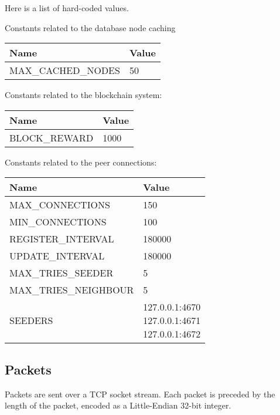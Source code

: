 \documentclass[../documentation.tex]{subfiles}
\begin{document}
Here is a list of hard-coded values.

Constants related to the database node caching

\bgroup{}
\def\arraystretch{1.25}
\begin{tabular}{|l|l|}
    \hline
    \textbf{Name} & \textbf{Value}
    \\ \hline
    MAX\_CACHED\_NODES & 50
    \\ \hline
\end{tabular}
\egroup{}

Constants related to the blockchain system:

\bgroup{}
\def\arraystretch{1.25}
\begin{tabular}{|l|l|}
    \hline
    \textbf{Name} & \textbf{Value}
    \\ \hline
    BLOCK\_REWARD & 1000
    \\ \hline
\end{tabular}
\egroup{}

Constants related to the peer connections:

\bgroup{}
\def\arraystretch{1.25}
\begin{tabular}{|l|l|}
    \hline
    \textbf{Name} & \textbf{Value}
    \\ \hline
    MAX\_CONNECTIONS & 150
    \\ \hline
    MIN\_CONNECTIONS & 100
    \\ \hline
    REGISTER\_INTERVAL & 180000
    \\ \hline
    UPDATE\_INTERVAL & 180000
    \\ \hline
    MAX\_TRIES\_SEEDER & 5
    \\ \hline
    MAX\_TRIES\_NEIGHBOUR & 5
    \\ \hline
    SEEDERS & \makecell[t] {
        127.0.0.1:4670 \\
        127.0.0.1:4671 \\
        127.0.0.1:4672
    }
    \\ \hline
\end{tabular}
\egroup{}

\pagebreak

\hypertarget{packets}{}
\subsection{Packets}

Packets are sent over a TCP socket stream.
Each packet is preceded by the length of the packet,
encoded as a Little-Endian 32-bit integer.
\end{document}
